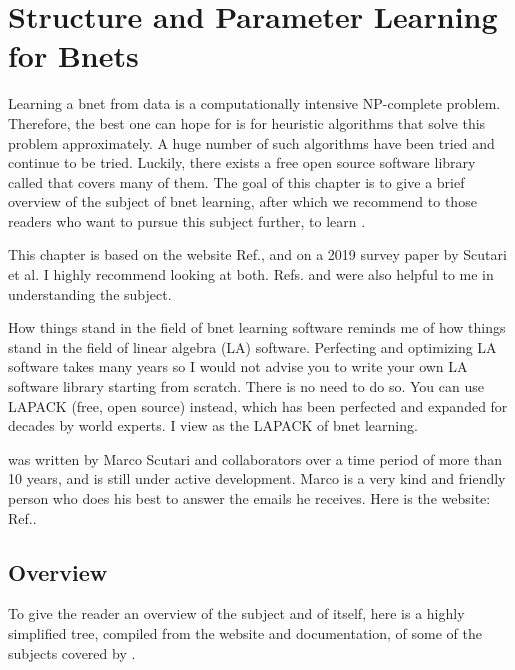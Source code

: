 \chapter{Structure and Parameter
 Learning for Bnets}\label{ch-struc-learn}


Learning a bnet
from data
is a computationally intensive NP-complete
problem. 
Therefore,
the best one can hope
for is for heuristic algorithms 
that solve this problem
approximately. A huge number 
of such algorithms have been tried
and continue to be tried.
Luckily,
there exists a free open source
 software library
called \bnlearn
that covers many of
them. The goal
of this chapter
is to give
a brief
overview
of the subject
of bnet 
learning,
after 
which
we recommend
to
those readers who
want to
pursue this subject
further,
to 
learn \bnlearn.

This chapter
is based on  
the \bnlearn website Ref.\cite{bnlearn}, and
on a 2019 survey
paper 
\cite{scutari2019}
by Scutari et al.
I highly recommend looking
at both. Refs.
\cite{carvalho} and \cite{margaritis}
were also
helpful to me in understanding the subject.


How things stand
in the field of
bnet learning software reminds me
of how things stand in 
the field of linear 
algebra (LA) software. Perfecting and
optimizing
LA software
takes many years so
I would not
advise you to write your own
LA software library starting
from scratch.
There is no need to do so. You
can use LAPACK (free, open source)
instead, which
has been perfected and expanded
for decades by world experts. 
I view \bnlearn as the LAPACK
of bnet learning. 

\bnlearn was
written by Marco Scutari
and collaborators
over a time period of
more than 10 years,
and is still
under active development.
Marco is a very kind and friendly
person who does his best to
answer the emails he receives.
Here is the \bnlearn website: Ref.\cite{bnlearn}.



\section*{Overview}

To give
the reader an overview
of the subject
and of \bnlearn itself,
here is a highly
simplified tree,
compiled from
the \bnlearn website
and documentation,
of some of the
subjects covered by \bnlearn.



